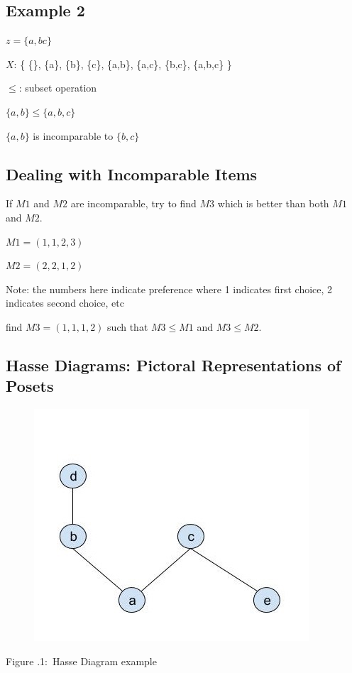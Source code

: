 \documentclass[twoside]{article}
\newcounter{lecnum}
\newcommand{\fig}[3]{
			\vspace{#2}
			\begin{center}
			Figure \thelecnum.#1:~#3
			\end{center}
	}
\begin{document}
\vspace{3mm} %

\subsection{Example 2}
$z = \{a, b c\}$

$X$: \{ \{\}, \{a\}, \{b\}, \{c\}, \{a,b\}, \{a,c\}, \{b,c\}, \{a,b,c\} \}

$\leq$: subset operation
\newline

$\{a,b\} \leq \{a,b,c\}$

$\{a,b\}$ is incomparable to $\{b,c\}$

\subsection{Dealing with Incomparable Items}
If $M1$ and $M2$ are incomparable, try to find $M3$ which is better than both $M1$ and $M2$.
\newline

$M1 = (1,1,2,3)$

$M2 = (2,2,1,2)$

Note: the numbers here indicate preference where 1 indicates first choice, 2 indicates second choice, etc
\newline

find $M3 = (1,1,1,2)$ such that $M3 \leq M1$ and $M3 \leq M2$.

\subsection{Hasse Diagrams: Pictoral Representations of Posets}
\begin{figure}[h]
\centering
\includegraphics[width=.8\textwidth]{hasse.jpg}
\end{figure}
\fig{1}{0cm}{Hasse Diagram example}
\end{document}
